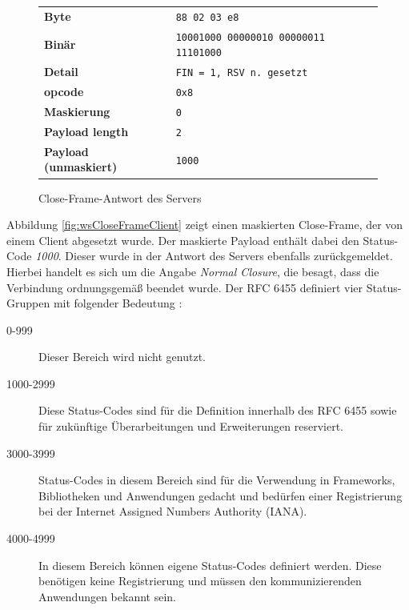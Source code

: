 \documentclass[11pt,a4paper,titlepage]{scrartcl}
\numberwithin{equation}{section}
\begin{document}
\begin{figure}[ht]
	\begin{center}
		\begin{tabular}{l>{\arraybackslash}p{8.0cm}}
			\textbf{Byte} & \texttt{88 02 03 e8} \\
			\textbf{Binär} & \texttt{10001000 00000010 00000011 11101000}\\
			\textbf{Detail} & \texttt{FIN = 1, RSV n. gesetzt} \\
			\textbf{opcode} & \texttt{0x8} \\ 
			\textbf{Maskierung} & \texttt{0}\\ 
			\textbf{Payload length} & \texttt{2}\\ 
			\textbf{Payload (unmaskiert)} & \texttt{1000} \\
		\end{tabular}
	\end{center}
	\caption{Close-Frame-Antwort des Servers}
	\label{fig:wsCloseFrameServer}
\end{figure}
\newpage
\noindent Abbildung \ref{fig:wsCloseFrameClient} zeigt einen maskierten Close-Frame, der von einem Client abgesetzt wurde. Der maskierte Payload enthält dabei den Status-Code \textit{1000}. Dieser wurde in der Antwort des Servers ebenfalls zurückgemeldet. Hierbei handelt es sich um die Angabe \textit{Normal Closure}, die besagt, dass die Verbindung ordnungsgemäß beendet wurde. Der RFC 6455 definiert vier Status-Gruppen mit folgender Bedeutung \autocite[46]{fette_websocket_2011}:
\begin{description}
	\item[0-999] Dieser Bereich wird nicht genutzt.
	\item[1000-2999] Diese Status-Codes sind für die Definition innerhalb des RFC 6455 sowie für zukünftige Überarbeitungen und Erweiterungen reserviert.
	\item[3000-3999] Status-Codes in diesem Bereich sind für die Verwendung in Frameworks, Bibliotheken und Anwendungen gedacht und bedürfen einer Registrierung bei der Internet Assigned Numbers Authority (IANA).
	\item[4000-4999] In diesem Bereich können eigene Status-Codes definiert werden. Diese benötigen keine Registrierung und müssen den kommunizierenden Anwendungen bekannt sein. 
\end{description}
\end{document}

